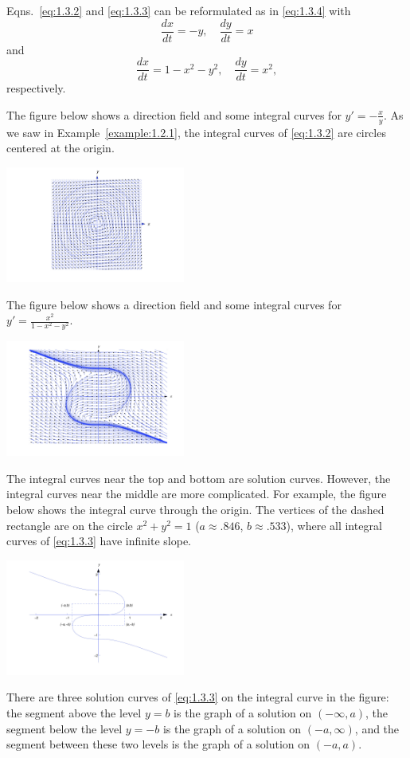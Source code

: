 \documentclass{ximera}
\begin{document}
Eqns.~\eqref{eq:1.3.2} and \eqref{eq:1.3.3} can be reformulated as in
\eqref{eq:1.3.4} with
$$
\frac{dx}{dt}=-y,\quad \frac{dy}{dt}=x
$$
and
$$
\frac{dx}{dt}=1-x^2-y^2,\quad \frac{dy}{dt}=x^2,
$$
respectively.
 
The figure below shows a direction field and some integral curves
for $y'=-\frac{x}{y}$. As we saw in
Example~\ref{example:1.2.1}, the integral curves of \eqref{eq:1.3.2}
are circles centered at the origin.
 
\begin{image}
\includegraphics[height=1.5in]{fig010305.jpg}
\end{image}
 
The figure below shows a direction field and some integral curves
for $y'=\frac{x^2}{1-x^2-y^2}$.
\begin{image}
\includegraphics[height=1.5in]{fig010306.jpg}
\end{image}
The integral curves near the top and bottom are
solution curves. However, the integral curves near the middle are more
complicated. For example, the figure below shows the integral
curve through the origin. The vertices of the dashed rectangle are on
the circle $x^2+y^2=1$ ($a\approx.846$, $b\approx.533$), where all
integral curves of \eqref{eq:1.3.3} have infinite slope.
\begin{image}
\includegraphics[height=1.5in]{fig010307.jpg}
\end{image}
There are
three solution curves of \eqref{eq:1.3.3} on the integral curve in the
figure: the segment above the level $y=b$ is the graph of a solution
on $(-\infty,a)$, the segment below the level $y=-b$ is the graph of a
solution on $(-a,\infty)$, and the segment between these two levels is
the graph of a solution on $(-a,a)$.
 
\end{document}
